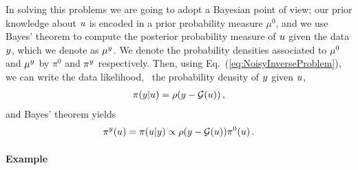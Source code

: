 In solving this problems we are going to adopt a Bayesian point of view; our
prior knowledge about $u$ is encoded in a prior probability measure
$\mu^0$, and we use Bayes' theorem to compute the posterior
probability measure of $u$ given the data $y$, which we denote as
$\mu^y$. We denote the probability densities associated to $\mu^0$ and
$\mu^y$ by $\pi^0$ and $\pi^y$ respectively. Then, using
Eq.~(\ref{eq:NoisyInverseProblem}), we can write the data likelihood,
\ie\ the probability density of $y$ given $u$,
\begin{align}
  \label{eq:YGivenUProbDensity}
  \pi(y|u) = \rho(y-\mathcal{G}(u))\, ,
\end{align}
and Bayes' theorem yields
\begin{align}
  \label{eq:BayesThmInversePosterior}
  \pi^y(u) = \pi(u|y) \propto \rho(y-\mathcal{G}(u)) \pi^0(u)\, .
\end{align}

\paragraph{Example}

